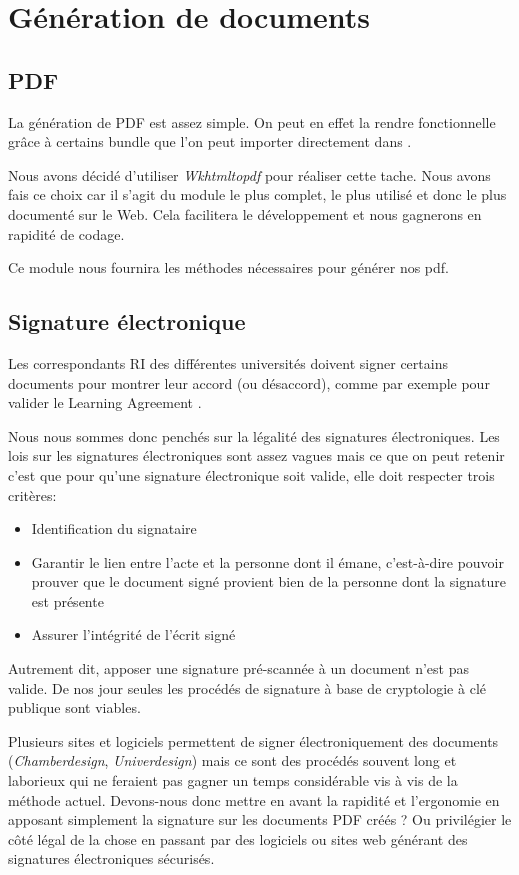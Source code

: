 \section{Génération de documents}
\subsection{PDF}

La génération de PDF est assez simple. On peut en effet la rendre fonctionnelle grâce à certains bundle que l'on peut importer directement dans \symfony.

Nous avons décidé d'utiliser \textit{Wkhtmltopdf} pour réaliser cette tache.
Nous avons fais ce choix car il s'agit du module le plus complet, le plus utilisé et donc le plus documenté sur le Web. Cela facilitera le développement et nous gagnerons en rapidité de codage.

Ce module nous fournira les méthodes nécessaires pour générer nos pdf.


\subsection{Signature électronique}
Les correspondants RI des différentes universités doivent signer certains documents pour montrer leur accord (ou désaccord), comme par exemple pour valider le \og Learning Agreement \fg{}.

Nous nous sommes donc penchés sur la légalité des signatures électroniques.
Les lois sur les signatures électroniques sont assez vagues mais ce que on peut retenir c'est que pour qu'une signature électronique soit valide, elle doit respecter trois critères:
\begin{itemize}
\item Identification du signataire
\item Garantir le lien entre l'acte et la personne dont il émane, c'est-à-dire pouvoir prouver que le document signé provient bien de la personne dont la signature est présente
\item Assurer l'intégrité de l'écrit signé
\end{itemize}
Autrement dit, apposer une signature pré-scannée à un document n'est pas valide.
De nos jour seules les procédés de signature à base de cryptologie à clé publique sont viables.

Plusieurs sites et logiciels permettent de signer électroniquement des documents (\textit{Chamberdesign}, \textit{Univerdesign}) mais ce sont des procédés souvent long et laborieux qui ne feraient pas gagner un temps considérable vis à vis de la méthode actuel.
Devons-nous donc mettre en avant la rapidité et l'ergonomie en apposant simplement la signature sur les documents PDF créés ? Ou privilégier le côté légal de la chose en passant par des logiciels ou sites web générant des signatures électroniques sécurisés.


